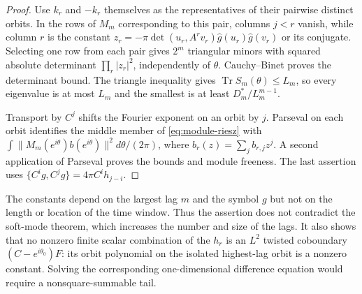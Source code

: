 \begin{proof}
Use $k_r$ and $-k_r$ themselves as the representatives of their pairwise
distinct orbits. In the rows of $M_m$ corresponding to this pair, columns
$j<r$ vanish, while column $r$ is the constant
$z_r=-\pi\det(u_r,A^rv_r)\widehat g(u_r)\widehat g(v_r)$ or its conjugate.
Selecting one row from each pair gives $2^m$ triangular minors with squared
absolute determinant $\prod_r|z_r|^2$, independently of $\theta$.
Cauchy--Binet proves the determinant bound. The triangle inequality gives
$\operatorname{Tr}S_m(\theta)\le L_m$, so every eigenvalue is at most $L_m$
and the smallest is at least $D_m^*/L_m^{m-1}$.

Transport by $C^j$ shifts the Fourier exponent on an orbit by $j$.
Parseval on each orbit identifies the middle member of
\eqref{eq:module-riesz} with
$\int\|M_m(e^{i\theta})b(e^{i\theta})\|^2d\theta/(2\pi)$,
where $b_r(z)=\sum_jb_{r,j}z^j$. A second application of Parseval proves the
bounds and module freeness. The last assertion uses
$\{C^ig,C^jg\}=4\pi C^ih_{j-i}$.
\end{proof}
The constants depend on the largest lag $m$ and the symbol $g$ but not on the
length or location of the time window. Thus the assertion does not contradict
the soft-mode theorem, which increases the number and size of the lags.
It also shows that no nonzero finite scalar combination of the $h_r$ is an
$L^2$ twisted coboundary $(C-e^{i\theta_0})F$: its orbit polynomial on the
isolated highest-lag orbit is a nonzero constant. Solving the corresponding
one-dimensional difference equation would require a nonsquare-summable tail.


